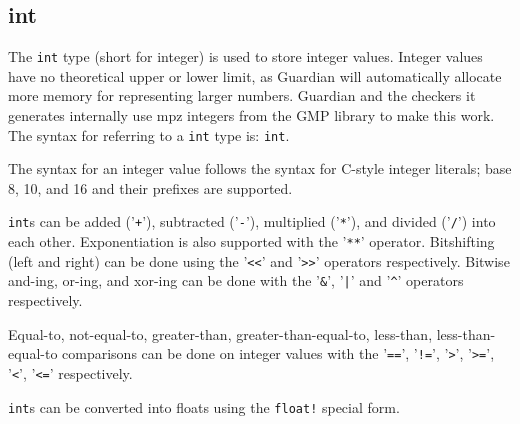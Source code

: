 
\subsection{int}
{
	The \texttt{int} type (short for integer) is used to store integer values.
	Integer values have no theoretical upper or lower limit, as Guardian will
	automatically allocate more memory for representing larger numbers.
	Guardian and the checkers it generates internally
	use mpz integers from the GMP library to make this
	work.
	The syntax for referring to a \texttt{int} type is: \texttt{int}.
	
	The syntax for an integer value follows the syntax for C-style integer
	literals; base 8, 10, and 16 and their prefixes are supported.
	
	\texttt{int}s can be added ('\texttt{+}'),
	subtracted ('\texttt{-}'), multiplied ('\texttt{*}'), and
	divided ('\texttt{/}') into each
	other. Exponentiation is also supported
	with the '\texttt{**}' operator. Bitshifting (left and right) can be done
	using the '\texttt{<<}' and '\texttt{>>}' operators respectively.
	Bitwise and-ing, or-ing, and xor-ing can be done with the '\texttt{\&}',
	'\texttt{|}' and '\texttt{\^}' operators respectively.
	
	Equal-to, not-equal-to, greater-than, greater-than-equal-to,
	less-than, less-than-equal-to comparisons can be done on integer values with
	the '\texttt{==}', '\texttt{!=}',
	'\texttt{>}', '\texttt{>=}', '\texttt{<}', '\texttt{<=}' respectively.
	
	\texttt{int}s can be converted into floats using the \texttt{float!}
	special form.
}
